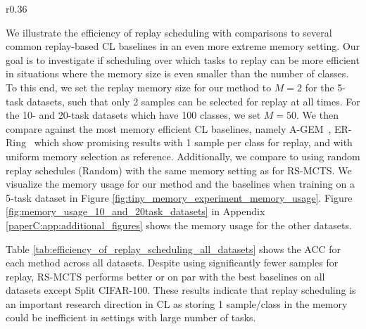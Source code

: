 \begin{wrapfigure}[12]{r}{0.36\textwidth}
	\centering
	\setlength{\figwidth}{0.33\textwidth}
	\setlength{\figheight}{.14\textheight}
	\vspace{-3mm}
	
	\vspace{-3mm}
	\captionsetup{width=.9\linewidth}
	\caption{
		Number of replayed samples per task for the 5-task datasets in the tiny memory setting. Ours use $M=2$ samples for replay, while the baselines increment their memory per task.
	}
	\label{fig:tiny_memory_experiment_memory_usage}
\end{wrapfigure}
We illustrate the efficiency of replay scheduling with comparisons to several common replay-based CL baselines in an even more extreme memory setting.
Our goal is to investigate if scheduling over which tasks to replay can be more efficient in situations where the memory size is even smaller than the number of classes. %
To this end, we set the replay memory size for our method
to $M=2$ for the 5-task datasets, such that only 2 samples can be selected for replay at all times. For the 10- and 20-task datasets which have 100 classes, we set $M=50$. We then compare against the most memory efficient CL baselines, namely A-GEM~, ER-Ring~ which show promising results with 1 sample per class for replay, %
and with uniform memory selection as reference. 
Additionally, we compare to using random replay schedules (Random) with the same memory setting as for RS-MCTS.
We visualize the memory usage for our method and the baselines when training on a 5-task dataset in Figure \ref{fig:tiny_memory_experiment_memory_usage}. 
Figure \ref{fig:memory_usage_10_and_20task_datasets} in Appendix \ref{paperC:app:additional_figures} shows the memory usage for the other datasets. 

Table \ref{tab:efficiency_of_replay_scheduling_all_datasets} shows the ACC for each method across all datasets. Despite using significantly fewer samples for replay, RS-MCTS performs better or on par with the best baselines on all datasets except Split CIFAR-100. 
These results indicate that replay scheduling is an important research direction in CL as storing 1 sample/class in the memory could be inefficient in settings with large number of tasks.

